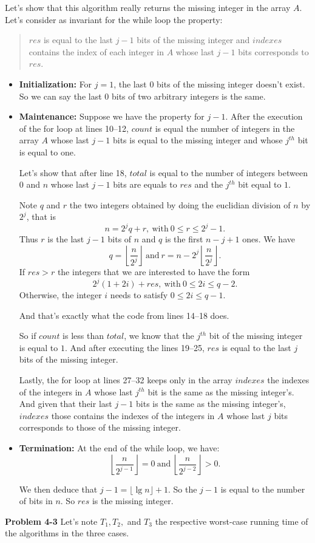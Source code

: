 \documentclass[a4paper,12pt]{article}
\newcommand{\newprob}[1]
{\bigskip \noindent \textbf{Problem #1} \newline}
\begin{document}
Let's show that this algorithm really returns the missing integer in
the array $A$.  Let's consider as invariant for the while loop the
property:
\begin{quote}
  $res$ is equal to the last $j-1$ bits of the missing integer and
  $indexes$ contains the index of each integer in $A$ whose last $j-1$
  bits corresponds to $res$.
\end{quote}

\begin{itemize}
\item
  \textbf{Initialization:}  For $j=1$, the last $0$ bits of the
  missing integer doesn't exist.  So we can say the last $0$ bits of
  two arbitrary integers is the same.

\item
  \textbf{Maintenance:}  Suppose we have the property for $j-1$.
  After the execution of the for loop at lines 10--12,  $count$ is
  equal the number of integers in the array $A$ whose last $j-1$ bits
  is equal to the missing integer and whose $j^{th}$ bit is equal to
  one.

  \medskip
  Let's show that after line 18, $total$ is equal to the number of
  integers between $0$ and $n$ whose last $j-1$ bits are equals to
  $res$ and the $j^{th}$ bit equal to $1$.

  Note $q$ and $r$ the two integers obtained by doing the euclidian
  division of $n$ by $2^j$, that is
  \[ n = 2^jq + r,\ \mbox{with}\ 0 \le r \le 2^j-1.\]
  Thus $r$ is the last $j-1$ bits of $n$ and $q$ is the first $n-j+1$
  ones.
  We have
  \[ q = \left\lfloor\frac{n}{2^j}\right\rfloor\ \mbox{and}\
  r = n - 2^j\left\lfloor\frac{n}{2^j}\right\rfloor.\]
  If $res > r$ the integers that we are interested to have the form
  \[ 2^j(1 + 2i) + res,\ \mbox{with}\ 0 \le 2i \le q-2.\]
  Otherwise, the integer $i$ needs to satisfy $0 \le 2i \le q-1$.

  And that's exactly what the code from lines 14--18 does.

  \medskip
  So if $count$ is less than $total$, we know that the $j^{th}$ bit of the missing
  integer is equal to $1$.  And after executing the lines 19--25,
  $res$ is equal to the last $j$ bits of the missing integer.

  Lastly, the for loop at lines 27--32 keeps only in the array
  $indexes$ the indexes of the integers in $A$ whose last $j^{th}$ bit
  is the same as the missing integer's.  And given that their last $j-1$
  bits is the same as the missing integer's,  $indexes$ those contains
  the indexes of the integers in $A$ whose last $j$ bits corresponds
  to those of the missing integer.

\item
  \textbf{Termination:}  At the end of the while loop, we have:
  \[\left\lfloor \frac{n}{2^{j-1}}\right\rfloor = 0\ \mbox{and}\
  \left\lfloor \frac{n}{2^{j-2}}\right\rfloor > 0.\]

  We then deduce that $j-1 = \lfloor \lg n\rfloor + 1$.  So the $j-1$
  is equal to the number of bits in $n$.  So $res$ is the missing integer.
  \end{itemize}
\newprob{4-3}
Let's note $T_1, T_2,$ and $T_3$ the respective worst-case running
time of the algorithms in the three cases.
\end{document}
